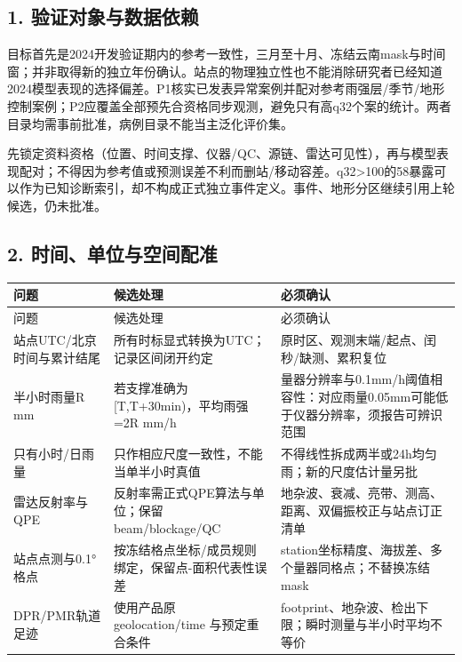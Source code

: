 \documentclass[UTF8,fontset=fandol,10pt]{ctexart}
\begin{document}
\subsection{1. 验证对象与数据依赖}

目标首先是2024开发验证期内的参考一致性，三月至十月、冻结云南mask与时间窗；并非取得新的独立年份确认。站点的物理独立性也不能消除研究者已经知道2024模型表现的选择偏差。P1核实已发表异常案例并配对参考雨强层/\allowbreak{}季节/\allowbreak{}地形控制案例；P2应覆盖全部预先合资格同步观测，避免只有高q32个案的统计。两者目录均需事前批准，病例目录不能当主泛化评价集。

先锁定资料资格（位置、时间支撑、仪器/\allowbreak{}QC、源链、雷达可见性），再与模型表现配对；不得因为参考值或预测误差不利而删站/\allowbreak{}移动容差。q32>100的58暴露可以作为已知诊断索引，却不构成正式独立事件定义。事件、地形分区继续引用上轮候选，仍未批准。

\subsection{2. 时间、单位与空间配准}

\begingroup\small\setlength{\tabcolsep}{3pt}\renewcommand{\arraystretch}{1.12}
\begin{longtable}{>{\raggedright\arraybackslash}p{\dimexpr(\linewidth-6\tabcolsep)/3\relax}>{\raggedright\arraybackslash}p{\dimexpr(\linewidth-6\tabcolsep)/3\relax}>{\raggedright\arraybackslash}p{\dimexpr(\linewidth-6\tabcolsep)/3\relax}}
\toprule
问题 & 候选处理 & 必须确认 \\
\midrule\endfirsthead
问题 & 候选处理 & 必须确认 \\
\midrule\endhead
站点UTC/\allowbreak{}北京时间与累计结尾 & 所有时标显式转换为UTC；记录区间闭开约定 & 原时区、观测末端/\allowbreak{}起点、闰秒/\allowbreak{}缺测、累积复位 \\
半小时雨量R mm & 若支撑准确为[T,T+30min)，平均雨强=2R mm/\allowbreak{}h & 量器分辨率与0.1mm/\allowbreak{}h阈值相容性：对应雨量0.05mm可能低于仪器分辨率，须报告可辨识范围 \\
只有小时/\allowbreak{}日雨量 & 只作相应尺度一致性，不能当单半小时真值 & 不得线性拆成两半或24h均匀雨；新的尺度估计量另批 \\
雷达反射率与QPE & 反射率需正式QPE算法与单位；保留beam/\allowbreak{}blockage/\allowbreak{}QC & 地杂波、衰减、亮带、测高、距离、双偏振校正与站点订正清单 \\
站点点测与0.1°格点 & 按冻结格点坐标/\allowbreak{}成员规则绑定，保留点-面积代表性误差 & station坐标精度、海拔差、多个量器同格点；不替换冻结mask \\
DPR/\allowbreak{}PMR轨道足迹 & 使用产品原 geolocation/\allowbreak{}time 与预定重合条件 & footprint、地杂波、检出下限；瞬时测量与半小时平均不等价 \\
\bottomrule\end{longtable}\endgroup
\end{document}
